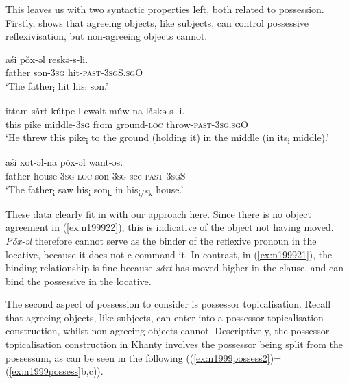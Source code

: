 \documentclass[output=paper
,modfonts
,nonflat]{langsci/langscibook}
\begin{document}
This leaves us with two syntactic properties left, both related to possession.
Firstly, \citet{nikolaeva1999} shows that agreeing objects, like subjects, can control possessive reflexivisation, but non-agreeing objects cannot. 

\begin{exe}
\ex \citet[][344]{nikolaeva1999} \label{ex:n1999possessrep}
\begin{xlist}
\ex
{\gll a\'{s}i p\v{o}x-əl reskə-s-li.\\
father son-\textsc{3sg} hit-\textsc{past-3sgS.sgO}\\
\glt `The father\textsubscript{i} hit his\textsubscript{i} son.'}

\ex
{\gll ittam s\v{a}rt k\v{u}tpe-l ewəlt m\v{u}w-na l\v{a}skə-s-li.\\
this pike middle-\textsc{3sg} from ground-\textsc{loc} throw-\textsc{past-3sg.sgO}\\
\glt `He threw this pike\textsubscript{i} to the ground (holding it) in the middle (in its\textsubscript{i} middle).'} \label{ex:n199921}

\ex
{\gll a\'{s}i xot-əl-na p\v{o}x-əl want-əs.\\
father house-\textsc{3sg-loc} son-\textsc{3sg} see-\textsc{past-3sgS}\\
\glt `The father\textsubscript{i} saw his\textsubscript{i} son\textsubscript{k} in his\textsubscript{i/*k} house.'} \label{ex:n199922}

\end{xlist}
\end{exe}

\noindent These data clearly fit in with our approach here. 
Since there is no object agreement in (\ref{ex:n199922}), this is indicative of the \theme{} object not having moved. 
\emph{P\v{o}x-əl} therefore cannot serve as the binder of the reflexive pronoun in the locative, because it does not c-command it.
In contrast, in (\ref{ex:n199921}), the binding relationship is fine because \emph{s\v{a}rt} has moved higher in the clause, and can bind the possessive in the locative.





The second aspect of possession to consider is possessor topicalisation.
Recall that agreeing objects, like subjects, can enter into a possessor topicalisation construction, whilst non-agreeing objects cannot.
Descriptively, the possessor topicalisation construction in Khanty involves the possessor being split from the possessum, as can be seen in the following ((\ref{ex:n1999possess2})=(\ref{ex:n1999possess}b,c)).
\end{document}
